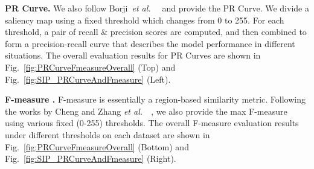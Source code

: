 \documentclass[journal]{IEEEtran}
\def\etal{{\em et al.~}}
\newcommand{\figref}[1]{Fig.~\ref{#1}}
\newcommand{\fdp}[1]{#1}
\begin{document}
\textbf{PR Curve.} We also follow Borji~\etal~\cite{borji2015salient}
\fdp{and} provide the PR Curve. We divide \fdp{a} saliency map  using a fixed
threshold which changes from 0 to 255.
For each threshold, a pair of recall \& precision scores are computed,
and \fdp{then} combined to form a precision-recall curve \fdp{that describes}
the model performance \fdp{in} different situations.
The overall evaluation results \fdp{for} PR Curves are shown in \figref{fig:PRCurveFmeasureOverall} (Top) and \figref{fig:SIP_PRCurveAndFmeasure} (Left).


\textbf{F-measure .} F-measure is essentially a \fdp{region-based} similarity metric.
Following \fdp{the works by} Cheng and Zhang \etal~\cite{zhang2017amulet,borji2015salient},
we also provide the max F-measure using \fdp{various} fixed (0-255) thresholds.
The overall \fdp{F-measure} evaluation results under different thresholds on each
dataset are shown in \figref{fig:PRCurveFmeasureOverall} (Bottom) and \figref{fig:SIP_PRCurveAndFmeasure} (Right).
\end{document}
